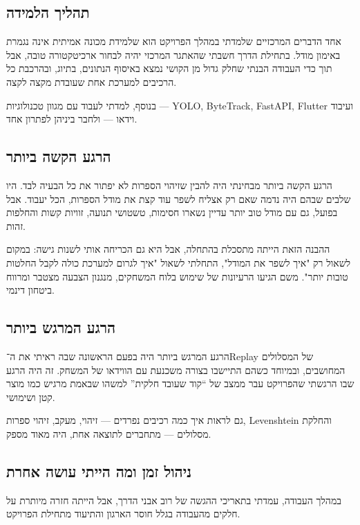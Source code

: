 \subsection{תהליך הלמידה}

אחד הדברים המרכזיים שלמדתי במהלך הפרויקט הוא שלמידת מכונה אמיתית אינה
נגמרת באימון מודל. בתחילת הדרך חשבתי שהאתגר המרכזי יהיה לבחור
ארכיטקטורה טובה, אבל תוך כדי העבודה הבנתי שחלק גדול מן הקושי נמצא
באיסוף הנתונים, בתיוג, ובהרכבת כל הרכיבים למערכת אחת שעובדת מקצה לקצה.

בנוסף, למדתי לעבוד עם מגוון טכנולוגיות --- \textenglish{YOLO},
\textenglish{ByteTrack}, \textenglish{FastAPI}, \textenglish{Flutter}
ועיבוד וידאו --- ולחבר ביניהן לפתרון אחד.

\subsection{הרגע הקשה ביותר}

הרגע הקשה ביותר מבחינתי היה להבין שזיהוי הספרות לא יפתור את כל הבעיה
לבד. היו שלבים שבהם היה נדמה שאם רק אצליח לשפר עוד קצת את מודל הספרות,
הכל יעבוד. אבל בפועל, גם עם מודל טוב יותר עדיין נשארו חסימות, טשטושי
תנועה, זוויות קשות והחלפות זהות.

ההבנה הזאת הייתה מתסכלת בהתחלה, אבל היא גם הכריחה אותי לשנות גישה:
במקום לשאול רק "איך לשפר את המודל", התחלתי לשאול "איך לגרום למערכת
כולה לקבל החלטות טובות יותר". משם הגיעו הרעיונות של שימוש בלוח
המשחקים, מנגנון הצבעה מצטבר ומרווח ביטחון דינמי.

\subsection{הרגע המרגש ביותר}

הרגע המרגש ביותר היה בפעם הראשונה שבה ראיתי את ה־\textenglish{Replay}
של המסלולים המחושבים, ובמיוחד כשהם התיישבו בצורה משכנעת עם הווידאו של
המשחק. זה היה הרגע שבו הרגשתי שהפרויקט עבר ממצב של ``קוד שעובד חלקית''
למשהו שבאמת מרגיש כמו מוצר קטן ושימושי.

גם לראות איך כמה רכיבים נפרדים --- זיהוי, מעקב, זיהוי ספרות,
\textenglish{Levenshtein} והחלקת מסלולים --- מתחברים לתוצאה אחת, היה
מאוד מספק.

\subsection{ניהול זמן ומה הייתי עושה אחרת}

במהלך העבודה, עמדתי בתאריכי ההגשה של רוב אבני הדרך, אבל הייתה חזרה
מיותרת על חלקים מהעבודה בגלל חוסר הארגון והתיעוד מתחילת הפרויקט.

